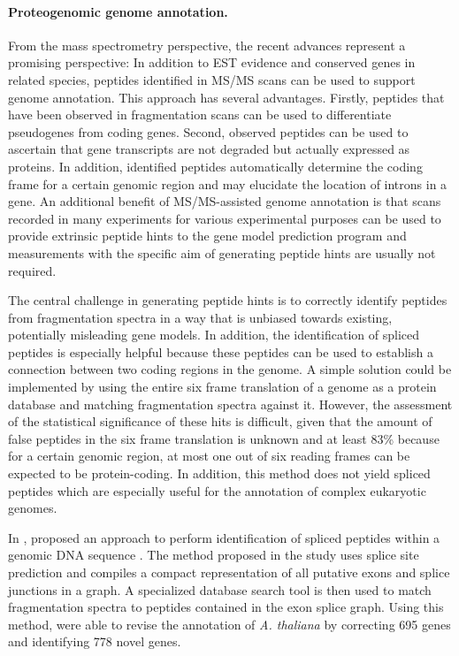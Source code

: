 \paragraph{Proteogenomic genome annotation.}

From the mass spectrometry perspective, the recent advances represent a
promising perspective: In addition to EST evidence and conserved genes in
related species, peptides identified in MS/MS scans can be used to support
genome annotation.
This approach has several advantages. Firstly, peptides that have been observed
in fragmentation scans can be used to differentiate pseudogenes from coding 
genes. 
Second, observed peptides can be used to ascertain that gene transcripts
are not degraded but actually expressed as proteins.
In addition, identified peptides automatically determine the coding frame
for a certain genomic region and may elucidate the location of introns in a 
gene.
An additional benefit of MS/MS-assisted genome annotation is that scans recorded
in many experiments for various experimental purposes can be used to provide
extrinsic peptide hints to the gene model prediction program and measurements 
with the specific aim of generating peptide hints are usually not required.

The central challenge in generating peptide hints is to correctly identify
peptides from fragmentation spectra in a way that is unbiased towards existing,
potentially misleading gene models. 
In addition, the identification of spliced peptides is especially helpful
because these peptides can be used to establish a connection between two
coding regions in the genome.
A simple solution could be implemented by using the entire six frame translation
of a genome as a protein database and matching fragmentation spectra against
it.
However, the assessment of the statistical significance of these hits is 
difficult, given that the amount of false peptides in the six frame translation
is unknown and at least 83\% because for a certain genomic region, at most
one out of six reading frames can be expected to be protein-coding.
In addition, this method does not yield spliced peptides which are especially
useful for the annotation of complex eukaryotic genomes.


In \citeyear{Tanner2007}, \citeauthor{Tanner2007} proposed an approach to
perform identification of spliced peptides within a genomic DNA sequence 
\citep{Tanner2007}.
The method proposed in the study uses splice site prediction and compiles
a compact representation of all putative exons and splice junctions in a 
graph.
A specialized database search tool is then used to match fragmentation spectra
to peptides contained in the exon splice graph.
Using this method, \citeauthor{Castellana2008} were able to revise the 
annotation of {\em A. thaliana} by correcting 695 genes and identifying
778 novel genes.


